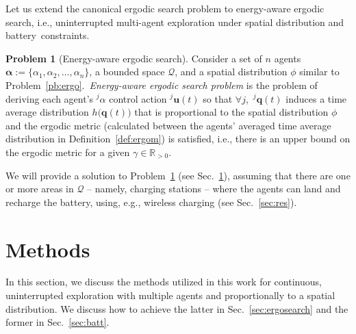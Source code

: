 \documentclass[letterpaper,10pt,conference,twoside]{IEEEtran}
\theoremstyle{definition}
\newtheorem{pb}{Problem}[section]
\begin{document}
Let us extend the canonical ergodic search problem to energy-aware ergodic search, i.e., uninterrupted multi-agent exploration %
under spatial distribution and battery~constraints.

\begin{pb}[Energy-aware ergodic search]\label{pb:enerergo}
  Consider a set of $n$ agents $\boldsymbol{\alpha}:=\{\alpha_1,\alpha_2,\dots,\alpha_n\}$, a bounded space $\mathcal{Q}$, and a spatial distribution $\phi$ similar to Problem~\ref{pb:ergo}.~\textit{Energy-aware ergodic search problem} is the problem of deriving each agent's ${}^j\alpha$ control action ${}^j\mathbf{u}(t)$ so that $\forall j,\,\,{}^j\mathbf{q}(t)$ induces a time average distribution $h\big(\mathbf{q}(t)\big)$ that is proportional to the spatial distribution $\phi$ and %
  the ergodic metric (calculated between the agents' averaged time average distribution in Definition~\ref{def:ergom}) is satisfied, i.e., there is an upper bound on the ergodic metric 
  for a given $\gamma\in\mathbb{R}_{>0}$.%
\end{pb}

We will provide a solution to Problem~\ref{pb:enerergo} (see Sec.~\ref{sec:meth}), assuming that there are one or more areas in $\mathcal{Q}$ -- namely, charging stations -- where the agents can land and recharge the battery, using, e.g., wireless charging (see Sec.~\ref{sec:res}). 


\section{Methods}\label{sec:meth}
\noindent
In this section, we discuss the methods utilized in this work for continuous, uninterrupted exploration with multiple agents and proportionally to a spatial distribution. 
%
We discuss how to achieve the latter in Sec.~\ref{sec:ergosearch} and the former in Sec.~\ref{sec:batt}.
\end{document}
